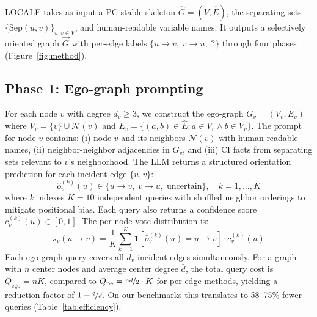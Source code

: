 \documentclass{article} %
\begin{document}
LOCALE takes as input a PC-stable skeleton $\hat{G} = (V, \hat{E})$, the separating sets $\{\text{Sep}(u,v)\}_{u,v \in V}$, and human-readable variable names. It outputs a selectively oriented graph $\vec{G}$ with per-edge labels $\{u \to v, \; v \to u, \; ?\}$ through four phases (Figure~\ref{fig:method}).

\subsection{Phase 1: Ego-graph prompting}

For each node $v$ with degree $d_v \geq 3$, we construct the ego-graph $G_v = (V_v, E_v)$ where $V_v = \{v\} \cup \mathcal{N}(v)$ and $E_v = \{(a,b) \in \hat{E} : a \in V_v \wedge b \in V_v\}$. The prompt for node $v$ contains: (i) node $v$ and its neighbors $\mathcal{N}(v)$ with human-readable names, (ii) neighbor-neighbor adjacencies in $G_v$, and (iii) CI facts from separating sets relevant to $v$'s neighborhood. The LLM returns a structured orientation prediction for each incident edge $\{u, v\}$:
\begin{equation}
    \hat{o}_{v}^{(k)}(u) \in \{u \to v, \; v \to u, \; \text{uncertain}\}, \quad k = 1, \ldots, K
\end{equation}
where $k$ indexes $K{=}10$ independent queries with shuffled neighbor orderings to mitigate positional bias. Each query also returns a confidence score $c_{v}^{(k)}(u) \in [0,1]$. The per-node vote distribution is:
\begin{equation}
    s_v(u \to v) = \frac{1}{K} \sum_{k=1}^{K} \mathbf{1}[\hat{o}_{v}^{(k)}(u) = u \to v] \cdot c_{v}^{(k)}(u)
\end{equation}
Each ego-graph query covers all $d_v$ incident edges simultaneously. For a graph with $n$ center nodes and average center degree $\bar{d}$, the total query cost is $Q_{\text{ego}} = nK$, compared to $Q_{\text{pe}} = \nicefrac{n\bar{d}}{2} \cdot K$ for per-edge methods, yielding a reduction factor of $1 - \nicefrac{2}{\bar{d}}$. On our benchmarks this translates to 58--75\% fewer queries (Table~\ref{tab:efficiency}).
\end{document}
